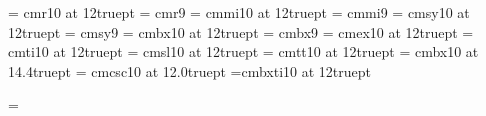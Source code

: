 %
%
%
%
%
%
%
%
%
%
\font\twelverm = cmr10  at 12truept
\font\ninerm   = cmr9
%
\font\twelvei  = cmmi10 at 12truept
\font\ninei    = cmmi9
%
\font\twelvesy = cmsy10 at 12truept
\font\ninesy   = cmsy9
%
\font\twelvebf = cmbx10 at 12truept
\font\ninebf   = cmbx9
%
\font\twelvex  = cmex10 at 12truept
\font\twelveit = cmti10 at 12truept
\font\twelvesl = cmsl10 at 12truept
\font\twelvett = cmtt10 at 12truept
%
%
\font\bigbc = cmbx10  at 14.4truept    %
\font\caps  = cmcsc10 at 12.0truept    %
%
%
\def\twelvepoint{   \def\rm{ \fam0 \twelverm }
  \textfont0=\twelverm \scriptfont0=\ninerm  \scriptscriptfont0=\sevenrm
  \textfont1=\twelvei  \scriptfont1=\ninei   \scriptscriptfont1=\seveni
  \textfont2=\twelvesy \scriptfont2=\ninesy  \scriptscriptfont2=\sevensy
  \textfont3=\twelvex  \scriptfont3=\twelvex \scriptscriptfont3=\twelvex
  \textfont\itfam=\twelveit         \def\it{ \fam\itfam \twelveit }
  \textfont\slfam=\twelvesl         \def\sl{ \fam\slfam \twelvesl }
  \textfont\ttfam=\twelvett         \def\tt{ \fam\ttfam \twelvett }
  \textfont\bffam=\twelvebf  \scriptfont\bffam=\ninebf
  \scriptscriptfont\bffam=\sevenbf  \def\bf{ \fam\bffam \twelvebf }
  \normalbaselineskip=18pt
  \normalbaselines \rm   }
%
\font\tenmbit=cmbxti10 at 12truept

\newfam\mbifam
\textfont\mbifam=\tenmbit

